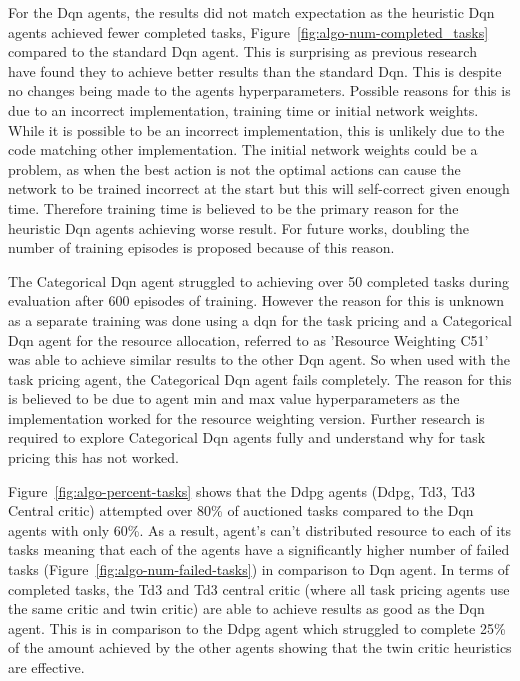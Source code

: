 For the Dqn agents, the results did not match expectation as the heuristic Dqn agents achieved fewer completed tasks,
Figure~\ref{fig:algo-num-completed_tasks} compared to the standard Dqn agent. This is surprising as previous
research~\citep{doubledqn, duelingdqn, rainbow} have found they to achieve better results than the standard Dqn.
This is despite no changes being made to the agents hyperparameters. Possible reasons for this is due to an incorrect
implementation, training time or initial network weights. While it is possible to be an incorrect implementation, this
is unlikely due to the code matching other implementation. The initial network weights could be a problem,
as when the best action is not the optimal actions can cause the network to be trained incorrect at the start but this
will self-correct given enough time. Therefore training time is believed to be the primary reason for the heuristic Dqn
agents achieving worse result. For future works, doubling the number of training episodes is proposed because of this
reason.

The Categorical Dqn agent struggled to achieving over 50 completed tasks during evaluation after 600 episodes of
training. However the reason for this is unknown as a separate training was done using a dqn for the task pricing and
a Categorical Dqn agent for the resource allocation, referred to as 'Resource Weighting C51' was able to achieve similar
results to the other Dqn agent. So when used with the task pricing agent, the Categorical Dqn agent fails completely.
The reason for this is believed to be due to agent min and max value hyperparameters as the implementation worked for
the resource weighting version. Further research is required to explore Categorical Dqn agents fully and understand
why for task pricing this has not worked.

Figure~\ref{fig:algo-percent-tasks} shows that the Ddpg agents (Ddpg, Td3, Td3 Central critic) attempted over 80\% of
auctioned tasks compared to the Dqn agents with only 60\%. As a result, agent's can't distributed resource to
each of its tasks meaning that each of the agents have a significantly higher number of failed tasks
(Figure~\ref{fig:algo-num-failed-tasks}) in comparison to Dqn agent. In terms of completed tasks, the Td3 and Td3
central critic (where all task pricing agents use the same critic and twin critic) are able to achieve results as good
as the Dqn agent. This is in comparison to the Ddpg agent which struggled to complete 25\% of the amount achieved by
the other agents showing that the twin critic heuristics are effective.

